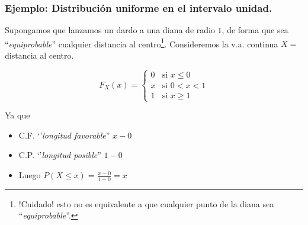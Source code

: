 \documentclass[handout]{beamer}\usepackage[]{graphicx}\usepackage[]{color}
\renewcommand{\leq}{\leqslant}
\renewcommand{\geq}{\geqslant}
\theoremstyle{plain}
\theoremstyle{definition}
\begin{document}
\begin{frame}
\frametitle{Ejemplo: Distribución uniforme en el intervalo unidad.}

Supongamos que lanzamos un dardo a una diana de radio $1$, de forma que sea
``\textit{equiprobable}'' cualquier distancia al centro\footnote{!Cuidado! esto no es equivalente
a que cualquier punto de la diana  sea ``\textit{equiprobable}''.}.
Consideremos la v.a. continua $X=$distancia al centro.

$$F_{X}(x)=\left\{\begin{array}{ll}
0 & \mbox{si } x\leq 0\\
x & \mbox{si } 0<x<1\\
1 & \mbox{si } x\geq 1
\end{array}\right.$$
\end{frame}

\begin{frame}


Ya que
\begin{itemize}
\item C.F. `'\textit{longitud favorable}'' $x-0$
\item C.P. `'\textit{longitud posible}'' $1-0$
\item Luego $P(X\leq x)=\frac{x-0}{1-0}=x$
\end{itemize}

\end{frame}

% 
% 
% 
\end{document}
